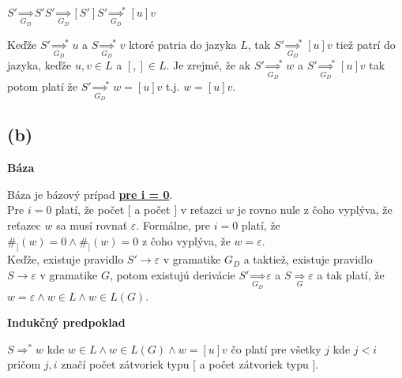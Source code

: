 \documentclass[11pt,a4paper]{article}
\begin{document}
\begin{center}
$S' \underset{G_D}{\Rightarrow} S'S' \underset{G_D}{\Rightarrow} [S']S' {\underset{G_D}{\Rightarrow}}^{*} [u]v$
\end{center}

Keďže $S' {\underset{G_D}{\Rightarrow}}^* u$ a $S {\underset{G_D}{\Rightarrow}}^* v$ ktoré patria do jazyka $L$, tak $S' {\underset{G_D}{\Rightarrow}}^* [u]v$ tiež patrí do jazyka, keďže $u, v \in L$ a $[,] \in L$. Je zrejmé, že ak $S' {\underset{G_D}{\Rightarrow}}^* w$ a $S' {\underset{G_D}{\Rightarrow}}^* [u]v$ tak potom platí že $S' {\underset{G_D}{\Rightarrow}}^* w = [u]v$ t.j. $w = [u]v$.

\subsection{(b)}

\textbf{Báza}
\begin{flushright}
\begin{minipage}{0.95\textwidth}
    Báza je bázový prípad \underline{\textbf{pre i = 0}}.\\

    Pre $i=0$ platí, že počet $[$ a počet $]$ v reťazci $w$ je rovno nule z čoho vyplýva, že reťazec $w$ sa musí rovnať $\varepsilon$. Formálne, pre $i=0$ platí, že $\#_{[}(w) = 0 \wedge \#_{]}(w) = 0$ z čoho vyplýva, že $w = \varepsilon$.\\

    Keďže, existuje pravidlo $S' \rightarrow \varepsilon$ v gramatike $G_D$ a taktiež, existuje pravidlo $S \rightarrow \varepsilon$ v gramatike $G$, potom existujú derivácie $S' \underset{G_D}{\Rightarrow} \varepsilon$ a $S \underset{G}{\Rightarrow} \varepsilon$ a tak platí, že $w = \varepsilon \wedge w \in L \wedge w \in L(G)$.
\end{minipage}
\end{flushright}

\textbf{Indukčný predpoklad}
\begin{flushright}
\begin{minipage}{0.95\textwidth}
    $S \Rightarrow^{*} w$ kde $w \in L \wedge w \in L(G) \wedge w = [u]v$ čo platí pre všetky $j$ kde $j < i$ pričom $j, i$ značí počet zátvoriek typu $[$ a počet zátvoriek typu $]$.
\end{minipage}
\end{flushright}
\end{document}
